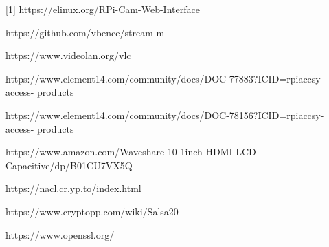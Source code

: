 \documentclass[onecolumn, draftclsnofoot,10pt, compsoc]{IEEEtran}
\begin{document}
[1] https://elinux.org/RPi-Cam-Web-Interface

\noindent	[2] https://github.com/vbence/stream-m

\noindent	[3] https://www.videolan.org/vlc

\noindent	[4] https://www.element14.com/community/docs/DOC-77883?ICID=rpiaccsy-access-
				products

\noindent	[5] https://www.element14.com/community/docs/DOC-78156?ICID=rpiaccsy-access-					products

\noindent 	[6] https://www.amazon.com/Waveshare-10-1inch-HDMI-LCD-Capacitive/dp/B01CU7VX5Q

\noindent	[7] https://nacl.cr.yp.to/index.html

\noindent	[8] https://www.cryptopp.com/wiki/Salsa20

\noindent	[9] https://www.openssl.org/
\end{document}

